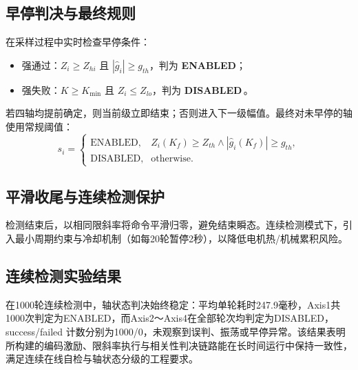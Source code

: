 \documentclass{ctexart}
\begin{document}
\subsection{早停判决与最终规则}

在采样过程中实时检查早停条件：
\begin{itemize}[leftmargin=2.5em]
  \item 强通过：$Z_i \ge Z_{hi}$ 且 $|\hat g_i| \ge g_{th}$，判为 \textbf{ENABLED}；
  \item 强失败：$K \ge K_{\min}$ 且 $Z_i \le Z_{lo}$，判为 \textbf{DISABLED}$\,$。
\end{itemize}
若四轴均提前确定，则当前级立即结束；否则进入下一级幅值。最终对未早停的轴使用常规阈值：
\begin{equation}
  s_i =
  \begin{cases}
    \text{ENABLED}, & Z_i(K_f) \ge Z_{th} \land |\hat g_i(K_f)| \ge g_{th}, \\
    \text{DISABLED}, & \text{otherwise}.
  \end{cases}
\end{equation}

\subsection{平滑收尾与连续检测保护}

检测结束后，以相同限斜率将命令平滑归零，避免结束瞬态。连续检测模式下，引入最小周期约束与冷却机制（如每20轮暂停2秒），以降低电机热/机械累积风险。

\subsection{连续检测实验结果}

在1000轮连续检测中，轴状态判决始终稳定：平均单轮耗时247.9毫秒，Axis1共1000次判定为ENABLED，而Axis2～Axis4在全部轮次均判定为DISABLED，success/failed 计数分别为1000/0，未观察到误判、振荡或早停异常。该结果表明所构建的编码激励、限斜率执行与相关性判决链路能在长时间运行中保持一致性，满足连续在线自检与轴状态分级的工程要求。
\end{document}
